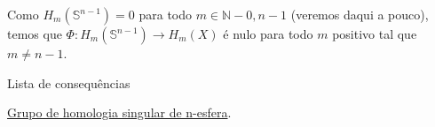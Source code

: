 Como $H_m(\mathbb{S}^{n-1})=0$ para todo $m\in\mathbb{N}-{0,n-1}$ (veremos daqui a pouco), temos que $\Phi:H_m(\mathbb{S}^{n-1})\rightarrow H_m(X)$ é nulo para todo $m$ positivo tal que $m\ne n-1$.

\begin{titlemize}{Lista de consequências}
    \item \hyperref[grupo-de-homologia-singular-de-n-esfera-prop]{Grupo de homologia singular de n-esfera}.\\
\end{titlemize}
